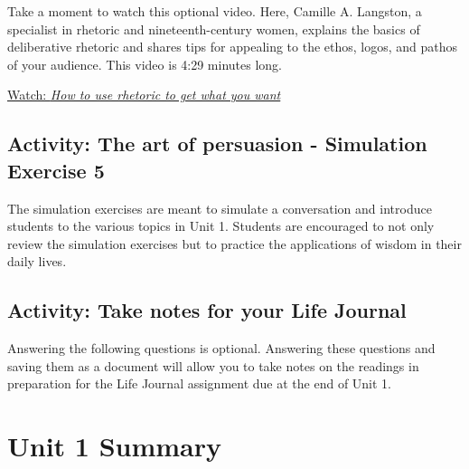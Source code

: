 \documentclass[
]{book}
\begin{document}
\begin{reflect}
Take a moment to watch this optional video. Here, Camille A. Langston, a specialist in rhetoric and nineteenth-century women, explains the basics of deliberative rhetoric and shares tips for appealing to the ethos, logos, and pathos of your audience. This video is 4:29 minutes long.

\href{https://www.youtube.com/watch?v=3klMM9BkW5o}{Watch: \emph{How to use rhetoric to get what you want}}
\end{reflect}

\hypertarget{activity-the-art-of-persuasion---simulation-exercise-5}{%
\subsection*{Activity: The art of persuasion - Simulation Exercise 5}\label{activity-the-art-of-persuasion---simulation-exercise-5}}

\begin{reflect}
The simulation exercises are meant to simulate a conversation and introduce students to the various topics in Unit 1. Students are encouraged to not only review the simulation exercises but to practice the applications of wisdom in their daily lives.
\end{reflect}

\hypertarget{activity-take-notes-for-your-life-journal-5}{%
\subsection*{Activity: Take notes for your Life Journal}\label{activity-take-notes-for-your-life-journal-5}}

\begin{reflect}
Answering the following questions is optional. Answering these questions and saving them as a document will allow you to take notes on the readings in preparation for the Life Journal assignment due at the end of Unit 1.
\end{reflect}

\hypertarget{unit-1-summary}{%
\section*{Unit 1 Summary}\label{unit-1-summary}}
\end{document}
